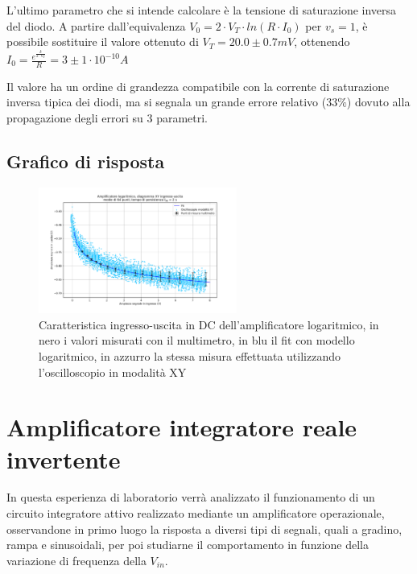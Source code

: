 \documentclass[journal]{IEEEtran}
\begin{document}
L'ultimo parametro che si intende calcolare è la tensione di saturazione inversa del diodo.
A partire dall'equivalenza $V_0 = 2 \cdot V_T \cdot ln(R \cdot I_0)$ per $v_s = 1$, è possibile sostituire il valore ottenuto di $V_T = 20.0 \pm 0.7 mV$, ottenendo
$I_0 = \frac{e^{\frac{k}{2 \cdot V_T}}}{R} = 3 \pm 1 \cdot 10^{-10} A$

Il valore ha un ordine di grandezza compatibile con la corrente di saturazione inversa tipica dei diodi, ma si segnala un grande errore relativo ($33 \% $) dovuto alla
propagazione degli errori su 3 parametri.

\subsection{Grafico di risposta}

\begin{figure}[H]%
\begin {center}
\includegraphics[trim = {100px 0 0 0}, width=0.58\textwidth]{analysis/output/OPA-log-fitted.pdf}
\caption{Caratteristica ingresso-uscita in DC dell'amplificatore logaritmico, in nero i valori misurati con il multimetro, in blu il fit con modello logaritmico, in azzurro la stessa misura effettuata utilizzando l'oscilloscopio in modalità XY}
\label{fig:OPA-integ-res}
\end {center}
\end{figure}


\section{Amplificatore integratore reale invertente} %
In questa esperienza di laboratorio verrà analizzato il funzionamento di un circuito integratore attivo realizzato mediante un amplificatore operazionale, osservandone in primo luogo la risposta a diversi tipi di segnali, quali a gradino, rampa e sinusoidali, per poi studiarne il comportamento in funzione della variazione di frequenza della $V_{in}$.
\end{document}
